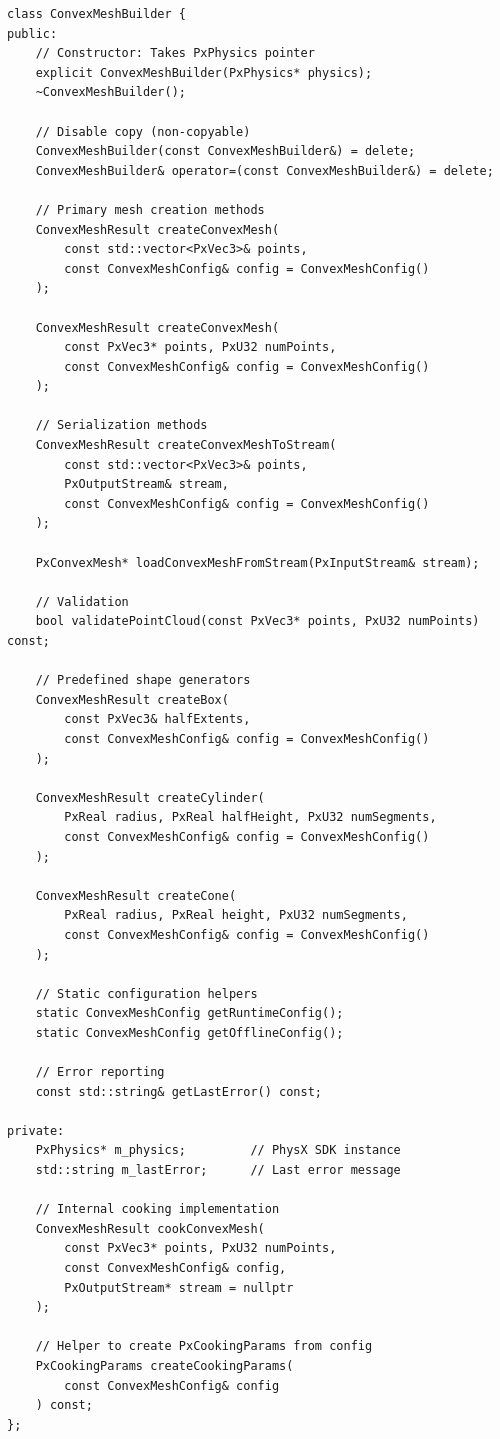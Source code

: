 \begin{lstlisting}[caption={ConvexMeshBuilder class declaration (simplified)}]
class ConvexMeshBuilder {
public:
    // Constructor: Takes PxPhysics pointer
    explicit ConvexMeshBuilder(PxPhysics* physics);
    ~ConvexMeshBuilder();

    // Disable copy (non-copyable)
    ConvexMeshBuilder(const ConvexMeshBuilder&) = delete;
    ConvexMeshBuilder& operator=(const ConvexMeshBuilder&) = delete;

    // Primary mesh creation methods
    ConvexMeshResult createConvexMesh(
        const std::vector<PxVec3>& points,
        const ConvexMeshConfig& config = ConvexMeshConfig()
    );

    ConvexMeshResult createConvexMesh(
        const PxVec3* points, PxU32 numPoints,
        const ConvexMeshConfig& config = ConvexMeshConfig()
    );

    // Serialization methods
    ConvexMeshResult createConvexMeshToStream(
        const std::vector<PxVec3>& points,
        PxOutputStream& stream,
        const ConvexMeshConfig& config = ConvexMeshConfig()
    );

    PxConvexMesh* loadConvexMeshFromStream(PxInputStream& stream);

    // Validation
    bool validatePointCloud(const PxVec3* points, PxU32 numPoints) const;

    // Predefined shape generators
    ConvexMeshResult createBox(
        const PxVec3& halfExtents,
        const ConvexMeshConfig& config = ConvexMeshConfig()
    );

    ConvexMeshResult createCylinder(
        PxReal radius, PxReal halfHeight, PxU32 numSegments,
        const ConvexMeshConfig& config = ConvexMeshConfig()
    );

    ConvexMeshResult createCone(
        PxReal radius, PxReal height, PxU32 numSegments,
        const ConvexMeshConfig& config = ConvexMeshConfig()
    );

    // Static configuration helpers
    static ConvexMeshConfig getRuntimeConfig();
    static ConvexMeshConfig getOfflineConfig();

    // Error reporting
    const std::string& getLastError() const;

private:
    PxPhysics* m_physics;         // PhysX SDK instance
    std::string m_lastError;      // Last error message

    // Internal cooking implementation
    ConvexMeshResult cookConvexMesh(
        const PxVec3* points, PxU32 numPoints,
        const ConvexMeshConfig& config,
        PxOutputStream* stream = nullptr
    );

    // Helper to create PxCookingParams from config
    PxCookingParams createCookingParams(
        const ConvexMeshConfig& config
    ) const;
};
\end{lstlisting}

